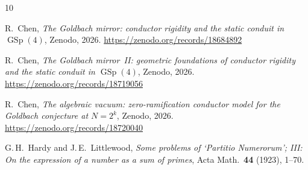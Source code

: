 \documentclass[11pt,a4paper]{article}
\theoremstyle{definition}
\DeclareMathOperator{\GSp}{GSp}
\begin{document}
\begin{thebibliography}{10}

R.~Chen, \emph{The Goldbach mirror: conductor rigidity and the static conduit in
$\GSp(4)$}, Zenodo, 2026.
\url{https://zenodo.org/records/18684892}

R.~Chen, \emph{The Goldbach mirror~{II}: geometric foundations of conductor
rigidity and the static conduit in $\GSp(4)$}, Zenodo, 2026.
\url{https://zenodo.org/records/18719056}

R.~Chen, \emph{The algebraic vacuum: zero-ramification conductor model for the
Goldbach conjecture at $N = 2^k$}, Zenodo, 2026.
\url{https://zenodo.org/records/18720040}

G.\,H.~Hardy and J.\,E.~Littlewood, \emph{Some problems of `Partitio Numerorum';
III: On the expression of a number as a sum of primes}, Acta Math.\
\textbf{44} (1923), 1--70.

\end{thebibliography}
\end{document}
